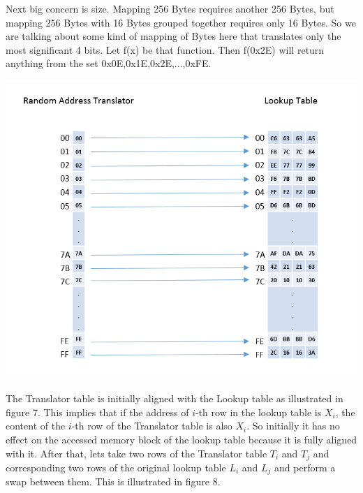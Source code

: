 Next big concern is size. Mapping 256 Bytes requires another 256 Bytes, but mapping 256 Bytes with 16 Bytes grouped together requires only 16 Bytes. So we are talking about some kind of mapping of Bytes here that translates only the most significant 4 bits. Let f(x) be that function. Then f(0x2E) will return anything from the set {0x0E,0x1E,0x2E,...,0xFE}.

\begin{center}
\includegraphics[scale=0.4,natwidth=785,natheight=666]{Figures/rat-init(new).png}
\label{fig: Random Address Translator Initialization.}
\end{center}

The Translator table is initially aligned with the Lookup table as illustrated in figure 7. This implies that if the address of $i$-th row in the lookup table is $X_i$, the content of the $i$-th row of the Translator table is also $X_i$. So initially it has no effect on the accessed memory block of the lookup table because it is fully aligned with it. After that, lets take two rows of the Translator table $T_i$ and $T_j$ and corresponding two rows of the original lookup table $L_i$ and $L_j$ and perform a swap between them. This is illustrated in figure 8.

